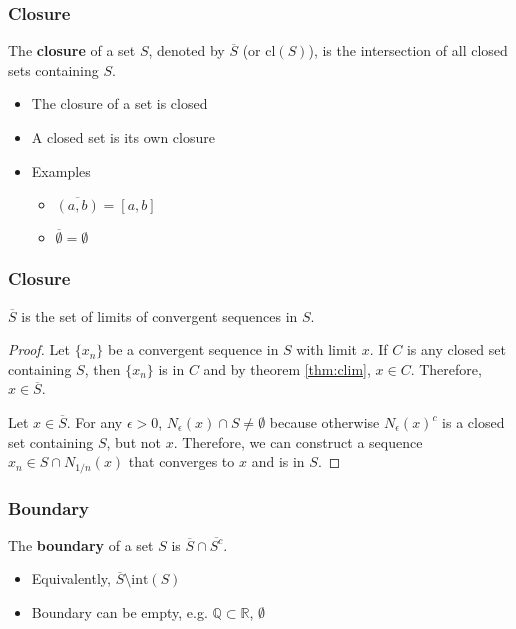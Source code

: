\documentclass[compress]{beamer}
\def\R{\mathbb{R}}
\begin{document}
\begin{frame}
  \frametitle{Closure}
  \begin{definition}
    The \textbf{closure} of a set $S$, denoted by $\overline{S}$ (or
    $\mathrm{cl}(S)$), is the intersection of all closed sets containing $S$.
  \end{definition}
  \begin{itemize}
  \item The closure of a set is closed
  \item A closed set is its own closure
  \item Examples
    \begin{itemize}
    \item $\overline{(a,b)} = [a,b]$
    \item $\overline{\emptyset} = \emptyset$
    \end{itemize}
  \end{itemize}
\end{frame}

\begin{frame}
  \frametitle{Closure}
  \begin{lemma}\label{lem:closure}
    $\overline{S}$ is the set of limits of convergent sequences in $S$.
  \end{lemma}
  \begin{proof}
    Let $\{x_n\}$ be a convergent sequence in $S$ with limit $x$. If $C$
    is any closed set containing $S$, then $\{x_n\}$ is in $C$ and by
    theorem \ref{thm:clim}, $x \in C$. Therefore, $x \in \overline{S}$. 
    
    Let $x \in \overline{S}$. For any $\epsilon>0$, $N_\epsilon(x) \cap
    S \neq \emptyset$ because otherwise $N_\epsilon(x)^c$ is a closed
    set containing $S$, but not $x$. Therefore, we can construct a
    sequence $x_n \in S \cap N_{1/n}(x)$ that converges to $x$ and is in
    $S$. 
  \end{proof}
\end{frame}

\begin{frame}
  \frametitle{Boundary}
  \begin{definition}
    The \textbf{boundary} of a set $S$ is $\overline{S} \cap
    \overline{S^c}$. 
  \end{definition}
  \begin{itemize}
  \item Equivalently, $\overline{S} \setminus \mathrm{int}(S)$
  \item Boundary can be empty, e.g. $\mathbb{Q} \subset \R$,
    $\emptyset$
  \end{itemize}
\end{frame}
\end{document}
